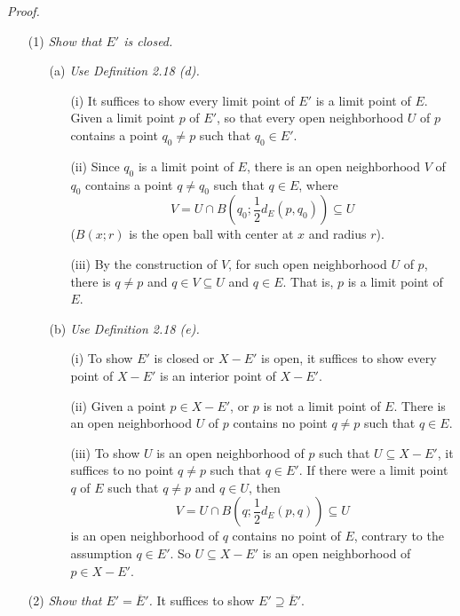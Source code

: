 \documentclass{article}
\begin{document}
\emph{Proof.}
\begin{enumerate}
\item[(1)]
\emph{Show that $E'$ is closed.}
  \begin{enumerate}
  \item[(a)]
  \emph{Use Definition 2.18 (d).}
    \begin{enumerate}
    \item[(i)]
    It suffices to show every limit point of $E'$ is a limit point of $E$.
    Given a limit point $p$ of $E'$, so that every open neighborhood $U$ of $p$
    contains a point $q_0 \neq p$ such that $q_0 \in E'$.
    \item[(ii)]
    Since $q_0$ is a limit point of $E$,
    there is an open neighborhood $V$ of $q_0$ contains a point $q \neq q_0$
    such that $q \in E$, where
    $$V = U \cap B\left( q_0; \frac{1}{2}d_E(p,q_0) \right) \subseteq U$$
    ($B(x;r)$ is the open ball with center at $x$ and radius $r$).
    \item[(iii)]
    By the construction of $V$,
    for such open neighborhood $U$ of $p$,
    there is $q \neq p$ and $q \in V \subseteq U$ and $q \in E$.
    That is, $p$ is a limit point of $E$.
    \end{enumerate}
  \item[(b)]
  \emph{Use Definition 2.18 (e).}
    \begin{enumerate}
    \item[(i)]
    To show $E'$ is closed or $X-E'$ is open,
    it suffices to show every point of $X-E'$ is an interior point of $X-E'$.
    \item[(ii)]
    Given a point $p \in X-E'$, or $p$ is not a limit point of $E$.
    There is an open neighborhood $U$ of $p$ contains no point $q \neq p$ such that $q \in E$.
    \item[(iii)]
    To show $U$ is an open neighborhood of $p$ such that $U \subseteq X-E'$,
    it suffices to no point $q \neq p$ such that $q \in E'$.
    If there were a limit point $q$ of $E$ such that $q \neq p$ and $q \in U$,
    then
    $$V = U \cap B\left( q; \frac{1}{2}d_E(p,q) \right) \subseteq U$$
    is an open neighborhood of $q$ contains no point of $E$,
    contrary to the assumption $q \in E'$.
    So $U \subseteq X-E'$ is an open neighborhood of $p \in X-E'$.
    \end{enumerate}
  \end{enumerate}
\item[(2)]
\emph{Show that $E' = \overline{E}'$.}
It suffices to show $E' \supseteq \overline{E}'$.

\end{enumerate}
\end{document}
